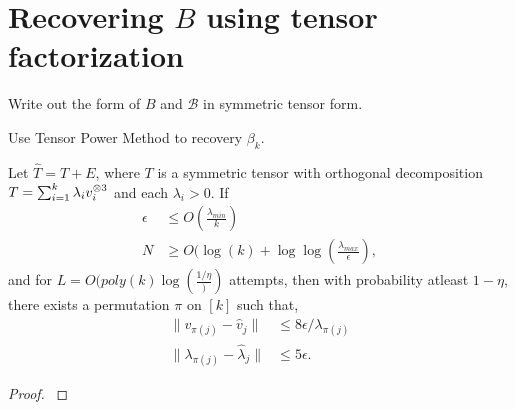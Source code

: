 \section{Recovering $B$ using tensor factorization}
\label{sec:tensor-power}

Write out the form of $B$ and $\mathcal{B}$ in symmetric tensor form.

Use Tensor Power Method to recovery $\beta_k$.

\begin{lemma}
  Let $\hat T = T + E$, where $T$ is a symmetric tensor with orthogonal decomposition $T = \sum_{i=1}^k \lambda_i v_i^{\otimes 3}$ and each $\lambda_i > 0$. If 
  \begin{align}
    \epsilon &\le O(\frac{\lambda_{min}}{k}) \\
    N &\ge O(\log(k) + \log \log(\frac{ \lambda_{max} }{\epsilon} ), 
  \end{align}
  and for $L = O( poly(k) \log(\frac{1/\eta}) )$  attempts, then with
  probability atleast $1 - \eta$, there exists a permutation $\pi$ on
  $[k]$ such that,
  \begin{align}
    \|v_{\pi(j)} - \hat v_j\| &\le 8 \epsilon/\lambda_{\pi(j)} \\
    \|\lambda_{\pi(j)} - \hat \lambda_j\| &\le 5 \epsilon.
  \end{align}
\end{lemma}
\begin{proof}
  \cite{AnandkumarGeHsu2012}
\end{proof}


